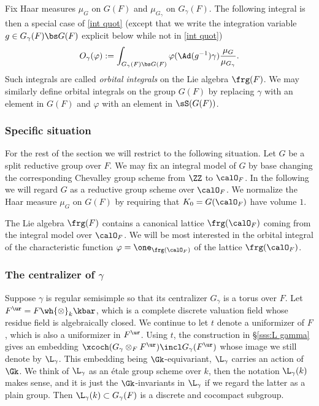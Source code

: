 Fix Haar measures $\mu_{G}$ on $G(F)$ and $\mu_{G_{\gamma}}$ on $G_{\gamma}(F)$. The following integral is then a special case of \eqref{int quot} (except that we write the integration variable $g\in G_{\gamma}(F)\bs G(F)$ explicit below while not in \eqref{int quot})
\begin{equation*}
O_{\gamma}(\varphi):=\int_{G_{\gamma}(F)\bs G(F)}\varphi(\Ad(g^{-1})\gamma)\frac{\mu_{G}}{\mu_{G_{\gamma}}}.
\end{equation*}
Such integrals are called {\em orbital integrals} on the Lie algebra $\frg(F)$. We may similarly define orbital integrals on the group $G(F)$ by replacing $\gamma$ with an element in $G(F)$ and $\varphi$ with an element in $\sS(G(F))$.

\subsubsection{Specific situation} For the rest of the section we will restrict to the following situation. Let $G$ be a split reductive group over $F$. We may fix an integral model of $G$ by base changing the corresponding Chevalley group scheme from $\ZZ$ to $\calO_{F}$. In the following we will regard $G$ as a reductive group scheme over $\calO_{F}$. We normalize the Haar measure $\mu_{G}$ on $G(F)$ by requiring that $K_{0}=G(\calO_{F})$ have volume $1$.

The Lie algebra $\frg(F)$ contains a canonical lattice $\frg(\calO_{F})$ coming from the integral model over $\calO_{F}$. We will be most interested in the orbital integral of the characteristic function $\varphi=\one_{\frg(\calO_{F})}$ of the lattice $\frg(\calO_{F})$. 

\subsubsection{The centralizer of $\gamma$} Suppose $\gamma$ is regular semisimple so that its centralizer $G_{\gamma}$ is a torus over $F$. Let $F^{\ur}=F\wh{\otimes}_{k}\kbar$, which is a complete discrete valuation field whose residue field is algebraically closed. We continue to let $t$ denote a uniformizer of $F$, which is also a uniformizer in $F^{\ur}$. Using $t$, the construction in \S\ref{sss:L gamma} gives an embedding $\xcoch(G_{\gamma}\otimes_{F}F^{\ur})\incl  G_{\gamma}(F^{\ur})$ whose image we still denote by $\L_{\gamma}$. This embedding being $\Gk$-equivariant, $\L_{\gamma}$ carries an action of $\Gk$. We think of $\L_{\gamma}$ as an \'etale group scheme over $k$, then the notation $\L_{\gamma}(k)$ makes sense, and it is just the $\Gk$-invariants in $\L_{\gamma}$ if we regard the latter as a plain group. Then $\L_{\gamma}(k)\subset G_{\gamma}(F)$ is a discrete and cocompact subgroup.


